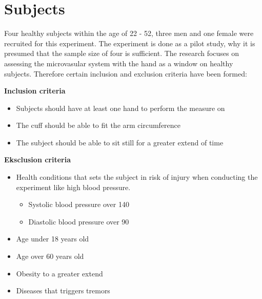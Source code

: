 \section{Subjects}

Four healthy subjects within the age of 22 - 52, three men and one female were recruited for this experiment. The experiment is done as a pilot study, why it is presumed that the sample size of four is sufficient. The research focuses on assessing the microvasular system with the hand as a window on healthy subjects. Therefore certain inclusion and exclusion criteria have been formed:

\textbf{Inclusion criteria}
\begin{itemize}[noitemsep]
	\item Subjects should have at least one hand to perform the measure on
	\item The cuff should be able to fit the arm circumference 
	\item The subject should be able to sit still for a greater extend of time
\end{itemize}

\textbf{Eksclusion criteria}
\begin{itemize}[noitemsep]
	\item Health conditions that sets the subject in risk of injury when conducting the experiment like high blood pressure.
	\begin{itemize}
		\item Systolic blood pressure over 140
		\item Diastolic blood pressure over 90
	\end{itemize}	
	\item Age under 18 years old
	\item Age over 60 years old
	\item Obesity to a greater extend
	\item Diseases that triggers tremors   
\end{itemize} 
